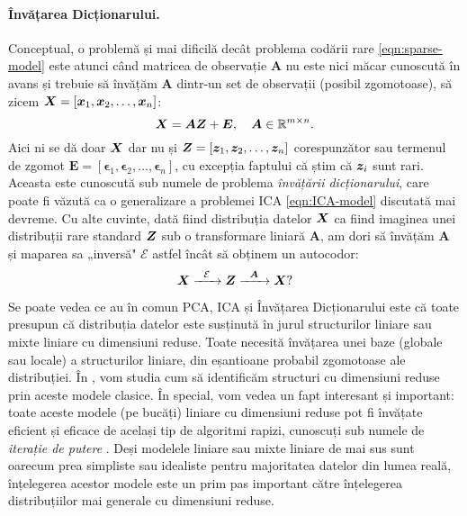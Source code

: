 \documentclass[../../book-main_ro.tex]{subfiles}
\begin{document}
\paragraph{Învățarea Dicționarului.}
Conceptual, o problemă și mai dificilă decât problema codării rare \eqref{eqn:sparse-model} este atunci când matricea de observație $\boldsymbol{A}$ nu este nici măcar cunoscută în avans și trebuie să învățăm $\boldsymbol{A}$ dintr-un set de observații (posibil zgomotoase), să zicem $\bm{X} = [\bm{x}_1, \bm{x}_2, \ldots, \bm{x}_n]$:
\begin{equation}
    \bm{X} = \boldsymbol{A} \bm{Z} + \boldsymbol{E}, \quad \boldsymbol{A} \in \mathbb{R}^{m\times n}.
    \label{eqn:dictionary-learning}
\end{equation}
Aici ni se dă doar $\bm{X}$ dar nu și $\bm{Z} = [\bm{z}_1, \bm{z}_2, \ldots, \bm{z}_n]$ corespunzător sau termenul de zgomot $\boldsymbol{E}= [\boldsymbol{\epsilon}_1, \boldsymbol{\epsilon}_2, \ldots, \boldsymbol{\epsilon}_n]$, cu excepția faptului că știm că $\bm{z}_i$ sunt rari. Aceasta este cunoscută sub numele de problema {\em învățării dicționarului}, care poate fi văzută ca o generalizare a problemei ICA \eqref{eqn:ICA-model} discutată mai devreme. Cu alte cuvinte, dată fiind distribuția datelor $\bm{X}$ ca fiind imaginea unei distribuții rare standard $\bm{Z}$ sub o transformare liniară $\boldsymbol{A}$, am dori să învățăm $\boldsymbol{A}$ și maparea sa „inversă" $\mathcal{E}$ astfel încât să obținem un autocodor:
\begin{equation}
    \bm{X}   \xrightarrow{\hspace{2mm} \mathcal{E} \hspace{2mm}}  \bm{Z} \xrightarrow{\hspace{2mm} \boldsymbol{A} \hspace{2mm}} \bm{X}?
       \label{eqn:decoding-DL}
\end{equation}

Se poate vedea ce au în comun PCA, ICA și Învățarea Dicționarului este că toate presupun că distribuția datelor este susținută în jurul structurilor liniare sau mixte liniare cu dimensiuni reduse. Toate necesită învățarea unei baze (globale sau locale) a structurilor liniare, din eșantioane probabil zgomotoase ale distribuției. În , vom studia cum să identificăm structuri cu dimensiuni reduse prin aceste modele clasice. În special, vom vedea un fapt interesant și important: toate aceste modele (pe bucăți) liniare cu dimensiuni reduse pot fi învățate eficient și eficace de același tip de algoritmi rapizi, cunoscuți sub numele de {\em iterație de putere} \cite{Zhai-2020}. Deși modelele liniare sau mixte liniare de mai sus sunt oarecum prea simpliste sau idealiste pentru majoritatea datelor din lumea reală, înțelegerea acestor modele este un prim pas important către înțelegerea distribuțiilor mai generale cu dimensiuni reduse.
\end{document}
